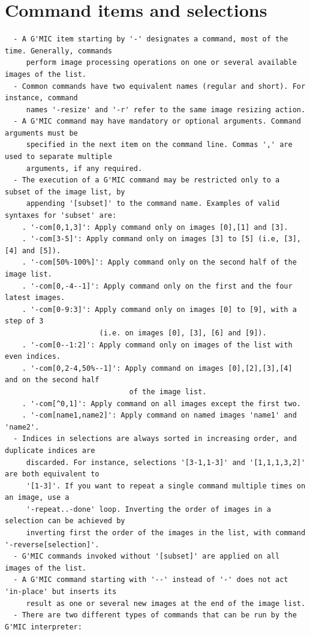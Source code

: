 \documentclass[a4paper,11pt,twoside]{book}
\begin{document}
\section{Command items and selections}
\small
\begin{lstlisting}
  - A G'MIC item starting by '-' designates a command, most of the time. Generally, commands 
     perform image processing operations on one or several available images of the list. 
  - Common commands have two equivalent names (regular and short). For instance, command 
     names '-resize' and '-r' refer to the same image resizing action. 
  - A G'MIC command may have mandatory or optional arguments. Command arguments must be 
     specified in the next item on the command line. Commas ',' are used to separate multiple 
     arguments, if any required. 
  - The execution of a G'MIC command may be restricted only to a subset of the image list, by 
     appending '[subset]' to the command name. Examples of valid syntaxes for 'subset' are: 
    . '-com[0,1,3]': Apply command only on images [0],[1] and [3]. 
    . '-com[3-5]': Apply command only on images [3] to [5] (i.e, [3],[4] and [5]). 
    . '-com[50%-100%]': Apply command only on the second half of the image list. 
    . '-com[0,-4--1]': Apply command only on the first and the four latest images. 
    . '-com[0-9:3]': Apply command only on images [0] to [9], with a step of 3 
                      (i.e. on images [0], [3], [6] and [9]). 
    . '-com[0--1:2]': Apply command only on images of the list with even indices. 
    . '-com[0,2-4,50%--1]': Apply command on images [0],[2],[3],[4] and on the second half 
                             of the image list. 
    . '-com[^0,1]': Apply command on all images except the first two. 
    . '-com[name1,name2]': Apply command on named images 'name1' and 'name2'. 
  - Indices in selections are always sorted in increasing order, and duplicate indices are 
     discarded. For instance, selections '[3-1,1-3]' and '[1,1,1,3,2]' are both equivalent to 
     '[1-3]'. If you want to repeat a single command multiple times on an image, use a 
     '-repeat..-done' loop. Inverting the order of images in a selection can be achieved by 
     inverting first the order of the images in the list, with command '-reverse[selection]'. 
  - G'MIC commands invoked without '[subset]' are applied on all images of the list. 
  - A G'MIC command starting with '--' instead of '-' does not act 'in-place' but inserts its 
     result as one or several new images at the end of the image list. 
  - There are two different types of commands that can be run by the G'MIC interpreter: 

\end{lstlisting}
\end{document}
